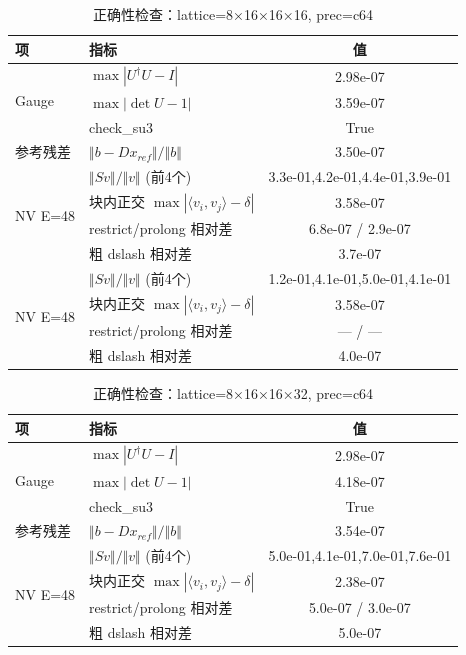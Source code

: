 \begin{table}[h]\centering
\begin{tabular}{llc}
\toprule
项 & 指标 & 值 \\
\midrule
\multirow{3}{*}{Gauge} & $\max|U^\dagger U-I|$ & 2.98e-07 \\
& $\max|\det U - 1|$ & 3.59e-07 \\
& check\_su3 & True \\
参考残差 & $\Vert b-D x_{ref}\Vert/\Vert b\Vert$ & 3.50e-07 \\
\multirow{4}{*}{NV E=48}
& $\Vert S v\Vert/\Vert v\Vert$ (前4个) & 3.3e-01,4.2e-01,4.4e-01,3.9e-01 \\
& 块内正交 $\max|\langle v_i,v_j\rangle-\delta|$ & 3.58e-07 \\
& restrict/prolong 相对差 & 6.8e-07 / 2.9e-07 \\
& 粗 dslash 相对差 & 3.7e-07 \\
\multirow{4}{*}{NV E=48}
& $\Vert S v\Vert/\Vert v\Vert$ (前4个) & 1.2e-01,4.1e-01,5.0e-01,4.1e-01 \\
& 块内正交 $\max|\langle v_i,v_j\rangle-\delta|$ & 3.58e-07 \\
& restrict/prolong 相对差 & — / — \\
& 粗 dslash 相对差 & 4.0e-07 \\
\bottomrule
\end{tabular}
\caption{正确性检查：lattice=8×16×16×16, prec=c64}
\end{table}
\begin{table}[h]\centering
\begin{tabular}{llc}
\toprule
项 & 指标 & 值 \\
\midrule
\multirow{3}{*}{Gauge} & $\max|U^\dagger U-I|$ & 2.98e-07 \\
& $\max|\det U - 1|$ & 4.18e-07 \\
& check\_su3 & True \\
参考残差 & $\Vert b-D x_{ref}\Vert/\Vert b\Vert$ & 3.54e-07 \\
\multirow{4}{*}{NV E=48}
& $\Vert S v\Vert/\Vert v\Vert$ (前4个) & 5.0e-01,4.1e-01,7.0e-01,7.6e-01 \\
& 块内正交 $\max|\langle v_i,v_j\rangle-\delta|$ & 2.38e-07 \\
& restrict/prolong 相对差 & 5.0e-07 / 3.0e-07 \\
& 粗 dslash 相对差 & 5.0e-07 \\
\bottomrule
\end{tabular}
\caption{正确性检查：lattice=8×16×16×32, prec=c64}
\end{table}
